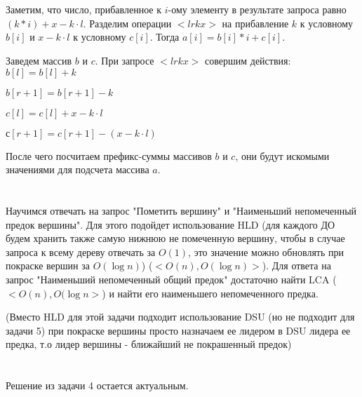 \documentclass{article}
\begin{document}
\begin{flushleft}

\section{}
Заметим, что число, прибавленное к $i$-ому элементу в результате запроса равно $(k * i) + x - k \cdot l$. Разделим операции $<l r k x>$ на прибавление $k$ к условному $b[i]$ и $x - k \cdot l$ к условному $c[i]$. Тогда $a[i] = b[i] * i + c[i]$.

Заведем массив $b$ и $c$. При запросе $<l r k x>$ совершим действия:
$b[l] = b[l] + k$

$b[r + 1] = b[r + 1] - k$

$c[l] = c[l] + x - k \cdot l$

$с[r + 1] = c[r + 1] - (x - k \cdot l)$

После чего посчитаем префикс-суммы массивов $b$ и $c$, они будут искомыми значениями для подсчета массива $a$. 


\section{}

\section{}

\section{}

Научимся отвечать на запрос "Пометить вершину" и "Наименьший непомеченный предок вершины". Для этого подойдет использование HLD (для каждого ДО будем хранить также самую нижнюю не помеченную вершину, чтобы в случае запроса к всему дереву отвечать за $O(1)$, это значение можно обновлять при покраске вершин за $O(\log{n})$) ($<O(n), O(\log{n})>$). Для ответа на запрос "Наименьший непомеченный общий предок" достаточно найти LCA ($<O(n), O(\log{n}>$) и найти его наименьшего непомеченного предка.

(Вместо HLD для этой задачи подходит использование DSU (но не подходит для задачи 5) при покраске вершины просто назначаем ее лидером в DSU лидера ее предка, т.о лидер вершины - ближайший не покрашенный предок)


\section{}

Решение из задачи 4 остается актуальным.

\end{flushleft}
\end{document}
